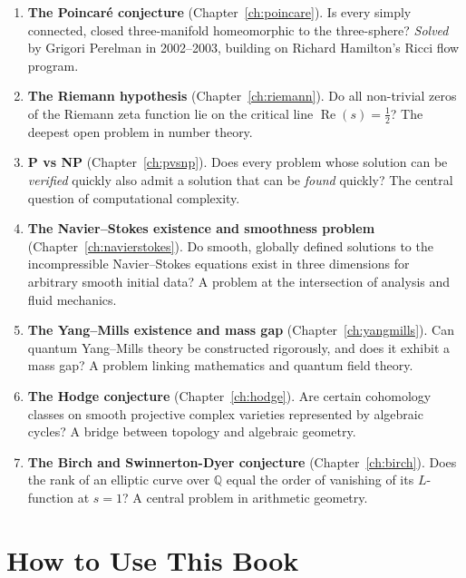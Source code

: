 \documentclass[11pt,a4paper]{book}
\theoremstyle{definition}
\begin{document}
\begin{enumerate}
  \item \textbf{The Poincar\'{e} conjecture} (Chapter~\ref{ch:poincare}). Is every simply connected, closed three-manifold homeomorphic to the three-sphere? \textit{Solved} by Grigori Perelman in 2002--2003, building on Richard Hamilton's Ricci flow program.

  \item \textbf{The Riemann hypothesis} (Chapter~\ref{ch:riemann}). Do all non-trivial zeros of the Riemann zeta function lie on the critical line $\operatorname{Re}(s) = \tfrac{1}{2}$? The deepest open problem in number theory.

  \item \textbf{P vs NP} (Chapter~\ref{ch:pvsnp}). Does every problem whose solution can be \emph{verified} quickly also admit a solution that can be \emph{found} quickly? The central question of computational complexity.

  \item \textbf{The Navier--Stokes existence and smoothness problem} (Chapter~\ref{ch:navierstokes}). Do smooth, globally defined solutions to the incompressible Navier--Stokes equations exist in three dimensions for arbitrary smooth initial data? A problem at the intersection of analysis and fluid mechanics.

  \item \textbf{The Yang--Mills existence and mass gap} (Chapter~\ref{ch:yangmills}). Can quantum Yang--Mills theory be constructed rigorously, and does it exhibit a mass gap? A problem linking mathematics and quantum field theory.

  \item \textbf{The Hodge conjecture} (Chapter~\ref{ch:hodge}). Are certain cohomology classes on smooth projective complex varieties represented by algebraic cycles? A bridge between topology and algebraic geometry.

  \item \textbf{The Birch and Swinnerton-Dyer conjecture} (Chapter~\ref{ch:birch}). Does the rank of an elliptic curve over $\mathbb{Q}$ equal the order of vanishing of its $L$-function at $s = 1$? A central problem in arithmetic geometry.
\end{enumerate}

\section*{How to Use This Book}
\end{document}
